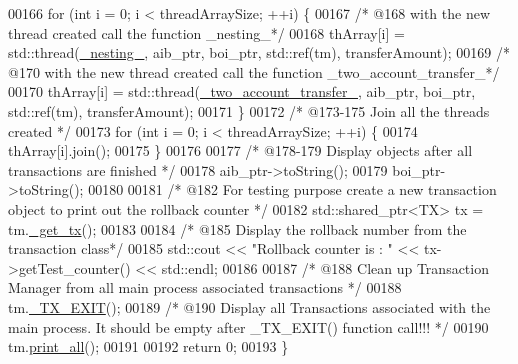 \begin{DoxyCode}
00166     \textcolor{keywordflow}{for} (\textcolor{keywordtype}{int} i = 0; i < threadArraySize; ++i) \{
00167             \textcolor{comment}{/* @168 with the new thread created call the function \_nesting\_*/}
00168             thArray[i] = std::thread(\hyperlink{main_8cpp_a5675cb594d74aa1bf5e80233370ffd81_a5675cb594d74aa1bf5e80233370ffd81}{\_nesting\_}, aib\_ptr, boi\_ptr, std::ref(tm), transferAmount);
00169             \textcolor{comment}{/* @170 with the new thread created call the function \_two\_account\_transfer\_*/}
00170             thArray[i] = std::thread(\hyperlink{main_8cpp_a83aef8c5b69afef4e38d14c17fe782b3_a83aef8c5b69afef4e38d14c17fe782b3}{\_two\_account\_transfer\_}, aib\_ptr, boi\_ptr, 
      std::ref(tm), transferAmount);
00171     \}
00172     \textcolor{comment}{/* @173-175 Join all the threads created */}
00173     \textcolor{keywordflow}{for} (\textcolor{keywordtype}{int} i = 0; i < threadArraySize; ++i) \{
00174         thArray[i].join();
00175     \}
00176 
00177     \textcolor{comment}{/* @178-179 Display objects after all transactions are finished */}
00178     aib\_ptr->toString();
00179     boi\_ptr->toString();
00180 
00181     \textcolor{comment}{/* @182 For testing purpose create a new transaction object to print out the rollback counter */}
00182     std::shared\_ptr<TX> tx = tm.\hyperlink{class_t_m_a41cb0226cc4080c931651b13f74a0075_a41cb0226cc4080c931651b13f74a0075}{\_get\_tx}();
00183 
00184     \textcolor{comment}{/* @185 Display the rollback number from the transaction class*/}
00185     std::cout << \textcolor{stringliteral}{"Rollback counter is : "} << tx->getTest\_counter() << std::endl;
00186 
00187     \textcolor{comment}{/* @188 Clean up Transaction Manager from all main process associated transactions */}
00188     tm.\hyperlink{class_t_m_a5e2d1127f2429f2f524d25f430eade06_a5e2d1127f2429f2f524d25f430eade06}{\_TX\_EXIT}();
00189     \textcolor{comment}{/* @190 Display all Transactions associated with the main process. It should be empty after \_TX\_EXIT()
       function call!!! */}
00190     tm.\hyperlink{class_t_m_a1d6891b1d3e71cc0acef54e7afe71c09_a1d6891b1d3e71cc0acef54e7afe71c09}{print\_all}();
00191 
00192     \textcolor{keywordflow}{return} 0;
00193 \}
\end{DoxyCode}
